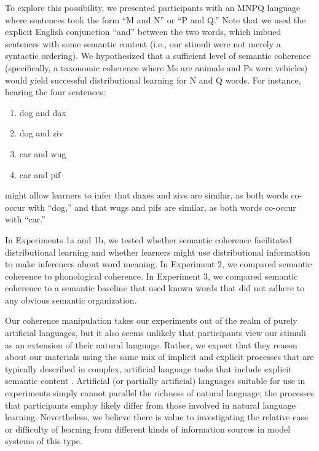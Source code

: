 \documentclass[man,floatsintext]{apa6}
\begin{document}
To explore this possibility, we presented participants with an MNPQ language where sentences took the form ``M and N'' or ``P and Q.'' Note that we used the explicit English conjunction ``and'' between the two words, which imbued sentences with some semantic content (i.e., our stimuli were not merely a syntactic ordering). We hypothesized that a sufficient level of semantic coherence (specifically, a taxonomic coherence where Ms are animals and Ps were vehicles) would yield successful distributional learning for N and Q words. For instance, hearing the four sentences:

\begin{enumerate}
\item dog and dax
\item dog and ziv
\item car and wug
\item car and pif
\end{enumerate}

\noindent might allow learners to infer that daxes and zivs are similar, as both words co-occur with ``dog,'' and that wugs and pifs are similar, as both words co-occur with ``car.''

In Experiments 1a and 1b, we tested whether semantic coherence facilitated distributional learning and whether learners might use distributional information to make inferences about word meaning. In Experiment 2, we compared semantic coherence to phonological coherence. In Experiment 3, we compared semantic coherence to a semantic baseline that used known words that did not adhere to any obvious semantic organization.

Our coherence manipulation takes our experiments out of the realm of purely artificial languages, but it also seems unlikely that participants view our stimuli as an extension of their natural language. Rather, we expect that they reason about our materials using the same mix of implicit and explicit processes that are typically described in complex, artificial language tasks that include explicit semantic content \citep{braine1987}. Artificial (or partially artificial) languages suitable for use in experiments simply cannot parallel the richness of natural language; the processes that participants employ likely differ from those involved in natural language learning. Nevertheless, we believe there is value to investigating the relative ease or difficulty of learning from different kinds of information sources in model systems of this type.
\end{document}
